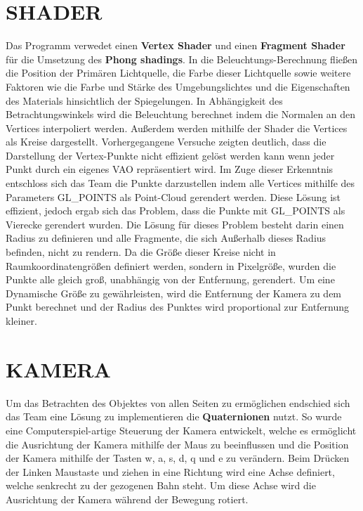 	\section{\Large SHADER}
	Das Programm verwedet einen \textbf{Vertex Shader} und einen \textbf{Fragment Shader} für die Umsetzung des \textbf{Phong shadings}. In die Beleuchtungs-Berechnung fließen die Position der Primären Lichtquelle, die Farbe dieser Lichtquelle sowie weitere Faktoren wie die Farbe und Stärke des Umgebungslichtes und die Eigenschaften des Materials hinsichtlich der Spiegelungen. In Abhängigkeit des Betrachtungswinkels wird die Beleuchtung berechnet indem die Normalen an den Vertices interpoliert werden. Außerdem werden mithilfe der Shader die Vertices als Kreise dargestellt.\newline\newline
 	Vorhergegangene Versuche zeigten deutlich, dass die Darstellung der Vertex-Punkte nicht effizient gelöst werden kann wenn jeder Punkt durch ein eigenes VAO repräsentiert wird. Im Zuge dieser Erkenntnis entschloss sich das Team die Punkte darzustellen indem alle Vertices mithilfe des Parameters GL\_POINTS als Point-Cloud gerendert werden. Diese Lösung ist effizient, jedoch ergab sich das Problem, dass die Punkte mit GL\_POINTS als Vierecke gerendert wurden. Die Lösung für dieses Problem besteht darin einen Radius zu definieren und alle Fragmente, die sich Außerhalb dieses Radius befinden, nicht zu rendern. Da die Größe dieser Kreise nicht in Raumkoordinatengrößen definiert werden, sondern in Pixelgröße, wurden die Punkte alle gleich groß, unabhängig von der Entfernung, gerendert. Um eine Dynamische Größe zu gewährleisten, wird die Entfernung der Kamera zu dem Punkt berechnet und der Radius des Punktes wird proportional zur Entfernung kleiner.
	
	\section{\Large KAMERA}
	Um das Betrachten des Objektes von allen Seiten zu ermöglichen endschied sich das Team eine Lösung zu implementieren die \textbf{Quaternionen} nutzt. So wurde eine Computerspiel-artige Steuerung der Kamera entwickelt, welche es ermöglicht die Ausrichtung der Kamera mithilfe der Maus zu beeinflussen und die Position der Kamera mithilfe der Tasten w, a, s, d, q und e zu verändern. Beim Drücken der Linken Maustaste und ziehen in eine Richtung wird eine Achse definiert, welche senkrecht zu der gezogenen Bahn steht. Um diese Achse wird die Ausrichtung der Kamera während der Bewegung rotiert.
		
